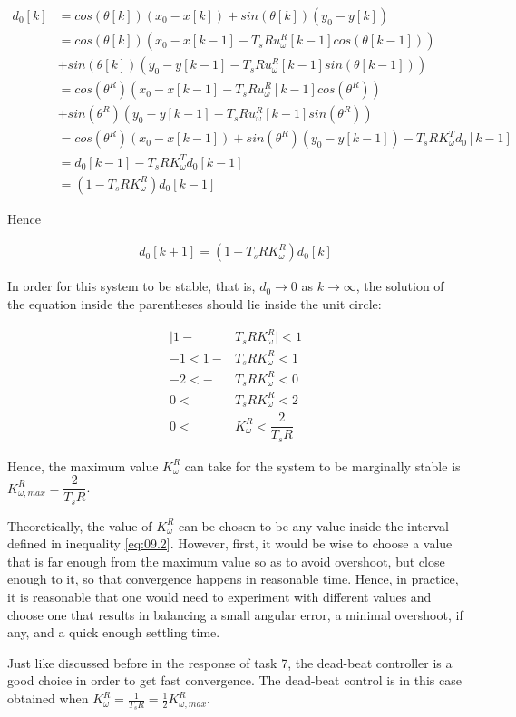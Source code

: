 \begin{align*}
  d_0[k] &= cos(\theta[k]) (x_0 - x[k]) + sin(\theta[k]) (y_0 - y[k]) \\
         &= cos(\theta[k]) (x_0 - x[k-1] - T_s R u_{\omega}^R[k-1] cos(\theta[k-1])) \\
         &+ sin(\theta[k]) (y_0 - y[k-1] - T_s R u_{\omega}^R[k-1] sin(\theta[k-1])) \\
         &= cos(\theta^R) (x_0 - x[k-1] - T_s R u_{\omega}^R[k-1] cos(\theta^R)) \\
         &+ sin(\theta^R) (y_0 - y[k-1] - T_s R u_{\omega}^R[k-1] sin(\theta^R)) \\
         &= cos(\theta^R) (x_0 - x[k-1]) + sin(\theta^R) (y_0 - y[k-1]) -T_s R K_{\omega}^T d_0[k-1]  \\
         &= d_0[k-1] - T_s R K_{\omega}^T d_0[k-1]  \\
         &= (1-T_s R K_{\omega}^R)d_0[k-1]
\end{align*}

Hence

\begin{align*}
  d_0[k+1]= (1-T_s R K_{\omega}^R)d_0[k]
\end{align*}

In order for this system to be stable, that is, $d_0 \to 0$ as $k \to \infty$,
the solution of the equation inside the parentheses should lie inside the unit
circle:

\begin{align}
  \Big|1 - &T_s R K_{\omega}^R\Big| < 1 \nonumber \\
  -1 < 1 - &T_s R K_{\omega}^R < 1 \nonumber \\
  -2 < - &T_s R K_{\omega}^R < 0 \nonumber \\
   0 <\ &T_s R K_{\omega}^R < 2 \nonumber \\
   0 <\ &K_{\omega}^R < \dfrac{2}{T_s R} \label{eq:09.2}
\end{align}

Hence, the maximum value $K_{\omega}^R$ can take for the system to be marginally
stable is $K_{\omega,max}^R = \dfrac{2}{T_s R}$.

Theoretically, the value of $K_{\omega}^R$ can be chosen to be any value inside
the interval defined in inequality \ref{eq:09.2}. However, first, it would be
wise to choose a value that is far enough from the maximum value so as to avoid
overshoot, but close enough to it, so that convergence happens in reasonable
time. Hence, in practice, it is reasonable that one would need to experiment
with different values and choose one that results in balancing a small angular
error, a minimal overshoot, if any, and a quick enough settling time.

Just like discussed before in the response of task 7, the dead-beat controller
is a good choice in order to get fast convergence. The dead-beat control is in
this case obtained when $K_\omega ^R = \frac{1}{T_s R} = \frac{1}{2}K_{\omega,max}^R$.
